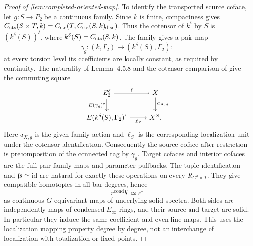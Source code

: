 \begin{proof}[Proof of \cref{lem:completed-oriented-map}]
To identify the transported source coface, let \(g:S\to P_2\) be a
continuous family. Since \(k\) is finite, compactness gives
\(C_{\mathrm{cts}}(S\times T,k)=C_{\mathrm{cts}}(T,C_{\mathrm{cts}}(S,k)_{\mathrm{disc}})\).
Thus the cotensor of \(k^\delta\) by \(S\) is
\((k^\delta(S))^\delta\), where \(k^\delta(S)=C_{\mathrm{cts}}(S,k)\).
The family gives a pair map
\[
 \gamma_g:(k,\Gamma_2)\longrightarrow(k^\delta(S),\Gamma_2):
\]
at every torsion level its coefficients are locally constant, as required
by continuity. The naturality of Lemma~4.5.8 and the cotensor comparison
of \cite[Remark~4.5.6]{BMR2026} give the commuting square
\[
 \begin{tikzcd}
 E_2^\delta \arrow[r,"\ell"]
   \arrow[d,"E(\gamma_g)^\delta"'] &
 X \arrow[d,"a_{X,g}"]\\
 E(k^\delta(S),\Gamma_2)^\delta \arrow[r,"\ell_S"'] & X^S .
 \end{tikzcd}
\]
Here \(a_{X,g}\) is the given family action and \(\ell_S\) is the
corresponding localization unit under the cotensor identification.
Consequently the source coface after restriction is precomposition of the
connected tag by \(\gamma_g\). Target cofaces and interior cofaces are the
full-pair family maps and parameter pullbacks. The tuple identification
and \(\mathfrak f\mathfrak s\simeq\mathrm{id}\) are natural for exactly
these operations on every \(R_{G^a\times T}\). They give compatible
homotopies in all bar degrees, hence
\[
 r^{\mathrm{cond}}b^\square\simeq c^\square
\]
as continuous \(G\)-equivariant maps of underlying solid spectra.
Both sides are independently maps of condensed \(E_\infty\)-rings, and
their source and target are solid. In particular they induce the same
coefficient and even-line maps. This uses the localization mapping
property degree by degree, not an interchange of localization with
totalization or fixed points.

\end{proof}
